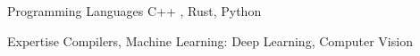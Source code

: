 
\begin{cvskills}

  \cvskill
    {Programming Languages}
    {C++ , Rust, Python}

  \cvskill
    {Expertise}
    {Compilers, Machine Learning: Deep Learning, Computer Vision}

\end{cvskills}
